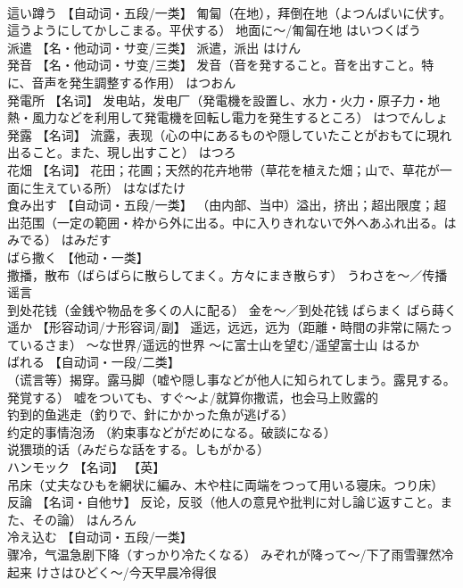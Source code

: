 \documentclass[8pt]{extreport}
\begin{document}
\begin{CJK}{UTF8}{min}
\\	這い蹲う	【自动词・五段/一类】 匍匐（在地），拜倒在地（よつんばいに伏す。這うようにしてかしこまる。平伏する） 地面に～/匍匐在地	はいつくばう	
\\	派遣	【名・他动词・サ变/三类】 派遣，派出	はけん	
\\	発音	【名・他动词・サ变/三类】 发音（音を発すること。音を出すこと。特に、音声を発生調整する作用）	はつおん	
\\	発電所	【名词】 发电站，发电厂（発電機を設置し、水力・火力・原子力・地熱・風力などを利用して発電機を回転し電力を発生するところ）	はつでんしょ	
\\	発露	【名词】 流露，表现（心の中にあるものや隠していたことがおもてに現れ出ること。また、現し出すこと）	はつろ	
\\	花畑	【名词】 花田；花圃；天然的花卉地带（草花を植えた畑；山で、草花が一面に生えている所）	はなばたけ	
\\	食み出す	【自动词・五段/一类】 （由内部、当中）溢出，挤出；超出限度；超出范围（一定の範囲・枠から外に出る。中に入りきれないで外へあふれ出る。はみでる）	はみだす	
\\	ばら撒く	【他动・一类】 
\\	撒播，散布（ばらばらに散らしてまく。方々にまき散らす） うわさを～／传播谣言 
\\	到处花钱（金銭や物品を多くの人に配る） 金を～／到处花钱	ばらまく	ばら蒔く
\\	遥か	【形容动词/ナ形容词/副】 遥远，远远，远为（距離・時間の非常に隔たっているさま） ～な世界/遥远的世界 ～に富士山を望む/遥望富士山	はるか	
\\	ばれる	【自动词・一段/二类】 
\\	（谎言等）揭穿。露马脚（嘘や隠し事などが他人に知られてしまう。露見する。発覚する） 嘘をついても、すぐ～よ/就算你撒谎，也会马上败露的 
\\	钓到的鱼逃走（釣りで、針にかかった魚が逃げる） 
\\	约定的事情泡汤 （約束事などがだめになる。破談になる） 
\\	说猥琐的话（みだらな話をする。しもがかる）		
\\	ハンモック	【名词】 【英】
\\	吊床（丈夫なひもを網状に編み、木や柱に両端をつって用いる寝床。つり床）		
\\	反論	【名词・自他サ】 反论，反驳（他人の意見や批判に対し論じ返すこと。また、その論）	はんろん	
\\	冷え込む	【自动词・五段/一类】 
\\	骤冷，气温急剧下降（すっかり冷たくなる） みぞれが降って～/下了雨雪骤然冷起来 けさはひどく～/今天早晨冷得很 

\end{CJK}
\end{document}
